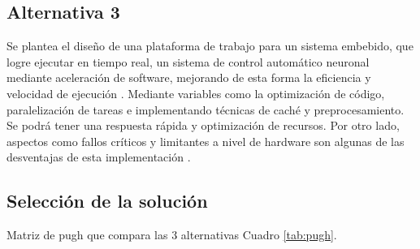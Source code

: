 \documentclass[12pt]{article}
\begin{document}
\subsection{Alternativa 3}
Se plantea el diseño de una plataforma de trabajo para un sistema embebido, que logre ejecutar en tiempo real, un sistema de control automático neuronal mediante aceleración de software, mejorando de esta forma la eficiencia y velocidad de ejecución \cite{galan2000control}. Mediante variables como la optimización de código, paralelización de tareas e implementando técnicas de caché y preprocesamiento. Se podrá tener una respuesta rápida y optimización de recursos. Por otro lado, aspectos como fallos críticos y limitantes a nivel de hardware son algunas de las desventajas de esta implementación \cite{kim1994software} \cite{razdan1994prisc}.


\subsection{Selección de la solución}

Matriz de pugh que compara las 3 alternativas Cuadro \ref{tab:pugh}.
\end{document}
